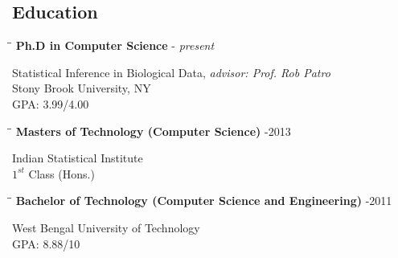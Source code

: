 \documentclass{res}
\begin{document}
\begin{resume}


\section{Education}          
 
 
 \vspace{-0.1in}	
   \begin{tabbing}
   \hspace{2.3in}\= \hspace{2.6in}\= \kill %
     {\bf Ph.D in Computer Science} \>    - {\it present}
   \end{tabbing}  \vspace{-20pt}      %
       Statistical Inference in Biological Data, {\it advisor: Prof. Rob Patro}  \\        
       Stony Brook University, NY     \\
       GPA: 3.99/4.00
 
 
 \vspace{-0.1in}	
   \begin{tabbing}
   \hspace{2.3in}\= \hspace{2.6in}\= \kill %
     {\bf Masters of Technology (Computer Science)}  \>     -2013 
   \end{tabbing}  \vspace{-20pt}      %
       Indian Statistical Institute     \\
       $1^{st}$ Class (Hons.) 


\vspace{-0.1in}	
\begin{tabbing}
\hspace{2.3in}\= \hspace{2.6in}\= \kill %
{\bf Bachelor of Technology (Computer Science and Engineering)}  \>     -2011
\end{tabbing}  \vspace{-20pt}      %
West Bengal University of Technology     \\       
GPA: 8.88/10      \\   




\end{resume}
\end{document}
